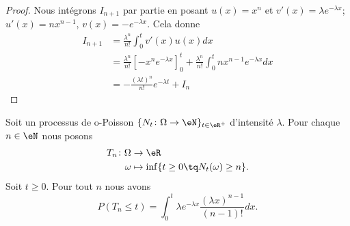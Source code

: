 \begin{proof}
	Nous intégrons \( I_{n+1}\) par partie en posant \( u(x)=x^n\) et \( v'(x)=\lambda e^{-\lambda x}\); \( u'(x)=nx^{n-1}\), \( v(x)=- e^{-\lambda x}\). Cela donne
	\begin{subequations}
		\begin{align}
			I_{n+1} & =\frac{ \lambda^n }{ n! }\int_0^tv'(x)u(x)dx                                                                              \\
			        & =\frac{ \lambda^n }{ n! }\left[ -x^n e^{-\lambda x} \right]_0^t+\frac{ \lambda^n }{ n! }\int_0^tnx^{n-1} e^{-\lambda x}dx \\
			        & =-\frac{ (\lambda t)^n }{ n! } e^{-\lambda t}+I_n
		\end{align}
	\end{subequations}
\end{proof}

\begin{lemma}
	Soit un processus de o-Poisson \(  \{ N_t\colon \Omega\to \eN \}_{t\in \eR^+}  \) d'intensité \( \lambda\). Pour chaque \( n\in \eN\) nous posons
	\begin{equation}
		\begin{aligned}
			T_n\colon \Omega & \to \eR                                         \\
			\omega           & \mapsto \inf\{ t\geq 0\tq N_t(\omega)\geq n \}.
		\end{aligned}
	\end{equation}
	Soit \( t\geq 0\). Pour tout \( n\) nous avons
	\begin{equation}    \label{EQooRHQLooVxFfjV}
		P(T_n\leq t)=\int_0^t\lambda  e^{-\lambda x}\frac{ (\lambda x)^{n-1} }{ (n-1)! }dx.
	\end{equation}
\end{lemma}

